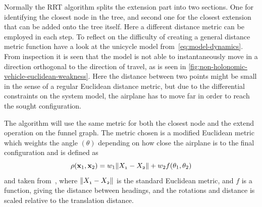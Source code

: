 Normally the \ac{RRT} algorithm splits the extension part into two sections. One
for identifying the closest node in the tree, and second one for the closest
extension that can be added onto the tree itself. Here a different distance
metric can be employed in each step. To reflect on the difficulty of creating a
general distance metric function have a look at the unicycle model
from~\cref{eq:model-dynamics}. From inspection it is seen that the model is not
able to instantaneously move in a direction orthogonal to the direction of
travel, as is seen in \cref{fig:non-holonomic-vehicle-euclidean-weakness}. Here
the distance between two points might be small in the sense of a regular
Euclidean distance metric, but due to the differential constraints on the system
model, the airplane has to move far in order to reach the sought configuration.

The \rrtfunnel{} algorithm will use the same metric for both the closest node
and the extend operation on the funnel graph. The metric chosen is a modified
Euclidean metric which weights the angle \((\theta)\) depending on how close the
airplane is to the final configuration and is defined as
\[
  \rho(\mathsf{\mathbf{x}}_{1}, \mathsf{\mathbf{x}}_{2}) = w_{1}\lVert\mathnormal{X_{1}} -
    \mathnormal{X_{2}}\rVert + w_{2}f(\theta_1,\theta_2)
\]
and taken from~\cite{kuffnerEffectiveSamplingDistance2004}, where
\(\lVert\mathnormal{X_{1}} - \mathnormal{X_{2}}\rVert\) is the standard Euclidean
metric, and \(f\) is a function, giving the distance between headings, and the
rotations and distance is scaled relative to the translation distance.

